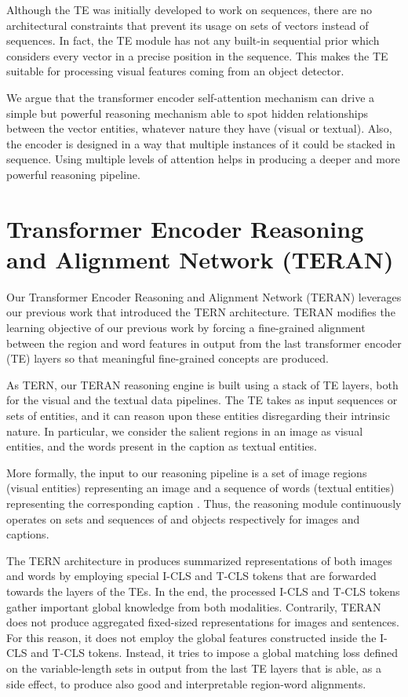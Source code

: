 \documentclass[acmsmall]{acmart}
\newif\ifdraft
\newcommand{\revised}[1]{\ifdraft{\leavevmode\color{blue}{#1}}\else{#1}\fi}
\begin{document}
Although the TE was initially developed to work on sequences, there are no architectural constraints that prevent its usage on sets of vectors instead of sequences. In fact, the TE module has not any built-in sequential prior which considers every vector in a precise position in the sequence. This makes the TE suitable for processing visual features coming from an object detector.

We argue that the transformer encoder self-attention mechanism can drive a simple but powerful reasoning mechanism able to spot hidden relationships between the vector entities, whatever nature they have (visual or textual). Also, the encoder is designed in a way that multiple instances of it could be stacked in sequence. Using multiple levels of attention helps in producing a deeper and more powerful reasoning pipeline.





\section{Transformer Encoder Reasoning and Alignment Network (TERAN)}
Our Transformer Encoder Reasoning and Alignment Network (TERAN) leverages our previous work \cite{messina2020tern} that introduced the TERN architecture. TERAN modifies the learning objective of our previous work by forcing a fine-grained alignment between the region and word features in output from the last transformer encoder (TE) layers so that meaningful fine-grained concepts are produced. 

As TERN, our TERAN reasoning engine is built using a stack of TE layers, both for the visual and the textual data pipelines. The TE takes as input sequences or sets of entities, and it can reason upon these entities disregarding their intrinsic nature.
In particular, we consider the salient regions in an image as visual entities, and the words present in the caption as textual entities.

More formally, the input to our reasoning pipeline is a set  of  image regions (visual entities) representing an image  and a sequence  of  words (textual entities) representing the corresponding caption .
Thus, the reasoning module continuously operates on sets and sequences of  and  objects respectively for images and captions. 

The TERN architecture in \cite{messina2020tern} produces summarized representations of both images and words by employing special I-CLS and T-CLS tokens that are forwarded towards the layers of the TEs. In the end, the processed I-CLS and T-CLS tokens gather important global knowledge from both modalities.
Contrarily, TERAN does not produce aggregated fixed-sized representations for images and sentences. \revised{For this reason, it does not employ the global features constructed inside the I-CLS and T-CLS tokens}. Instead, it tries to impose a global matching loss defined on the variable-length sets in output from the last TE layers that is able, as a side effect, to produce also good and interpretable region-word alignments.
\end{document}

